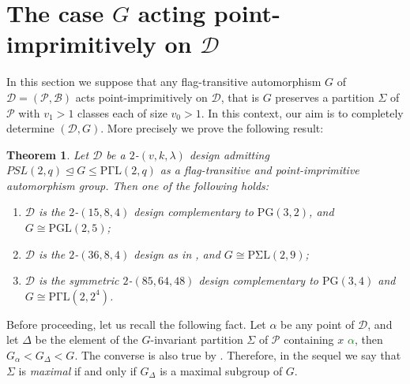 \documentclass[a4paper,twopage,reqno,12pt]{amsart}
\newtheorem{theorem}{Theorem}[section]
\theoremstyle{definition}
\numberwithin{equation}{section}
\newcommand{\PGL}{\mathrm{PGL}}
\newcommand{\PGaL}{\mathrm{P\Gamma L}}
\newcommand{\PSigL}{\mathrm{P\Sigma L}}
\newcommand{\PG}{\mathrm{PG}}
\renewcommand{\leq}{\leqslant}
\begin{document}
\section{The case $G$ acting point-imprimitively on $\mathcal{D}$}\label{FT-PI-Section}
In this section we suppose that any flag-transitive automorphism $G$ of $\mathcal{D}=\left(\mathcal{P},\mathcal{B}\right)$ acts point-imprimitively on $\mathcal{D}$, that is $G$ preserves a partition $\Sigma $ of $\mathcal{P}$ with $v_{1}>1$ classes each of size $v_{0}>1$. In this context, our aim is to completely determine $\left(\mathcal{D},G\right)$. More precisely we prove the following result:

\bigskip
\begin{theorem}\label{FTPI}
Let $\mathcal{D}$ be a $2$-$(v,k,\lambda)$ design admitting $PSL(2,q) \unlhd G\leq \PGaL(2,q)$ as a flag-transitive and point-imprimitive automorphism group. Then one of the following holds:
\begin{enumerate}
\item $\mathcal{D}$ is the $2$-$(15,8,4)$ design complementary to $\PG(3,2)$, and $ G\cong
\PGL(2,5)$;
\item $\mathcal{D}$ is the $2$-$(36,8,4)$ design as in \cite[Construction 9]{DP}, and $G\cong \PSigL(2,9)$;
\item $\mathcal{D}$ is the symmetric $2$-$(85,64,48)$ design complementary to $\PG(3,4)$ and $G\cong \PGaL (2,2^4)$.
\end{enumerate}
\end{theorem}

\bigskip 
Before proceeding, let us recall the following fact. Let $\alpha$ be any point of $\mathcal{D}$, and let $\Delta$ be the element of the $G$-invariant partition $\Sigma$ of $\mathcal{P}$ containing $x$ \textcolor{green}{$\alpha$}, then $G_{\alpha}<G_{\Delta}<G$. The converse is also true by \cite[Theorem 1.5A]{DM}. Therefore, in the sequel we say that $\Sigma$ is \emph{maximal} if and only if $G_{\Delta}$ is a maximal subgroup of $G$.
\end{document}
